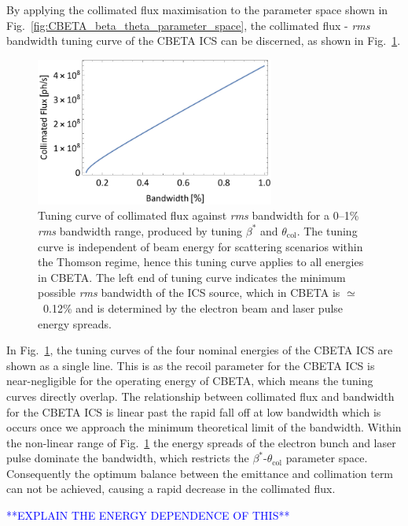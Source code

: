 \documentclass[../main.tex]{subfiles}
\begin{document}
By applying the collimated flux maximisation to the parameter space shown in Fig.~\ref{fig:CBETA_beta_theta_parameter_space}, the collimated flux - \textit{rms} bandwidth tuning curve of the CBETA ICS can be discerned, as shown in Fig.~\ref{fig:CBETA_Tuning_Curve}. 
\begin{figure}[!h]
\centering
\includegraphics[width=0.7\textwidth]{Figures/CBETA_Inverse_Compton_Source_Design/CBETATuningCurve.pdf}
\caption{Tuning curve of collimated flux against \textit{rms} bandwidth for a 0--1\% \textit{rms} bandwidth range, produced by tuning $\beta^{*}$ and $\theta_{\mathrm{col}}$. The tuning curve is independent of beam energy for scattering scenarios within the Thomson regime, hence this tuning curve applies to all energies in CBETA. The left end of tuning curve indicates the minimum possible \textit{rms} bandwidth of the ICS source, which in CBETA is $\simeq$~0.12\% and is determined by the electron beam and laser pulse energy spreads.}
\label{fig:CBETA_Tuning_Curve}
\end{figure}

In Fig.~\ref{fig:CBETA_Tuning_Curve}, the tuning curves of the four nominal energies of the CBETA ICS are shown as a single line. This is as the recoil parameter for the CBETA ICS is near-negligible for the operating energy of CBETA, which means the tuning curves directly overlap. The relationship between collimated flux and bandwidth for the CBETA ICS is linear past the rapid fall off at low bandwidth which is occurs once we approach the minimum theoretical limit of the bandwidth. Within the non-linear range of Fig.~\ref{fig:CBETA_Tuning_Curve} the energy spreads of the electron bunch and laser pulse dominate the bandwidth, which restricts the $\beta^{*}$-$\theta_{\mathrm{col}}$ parameter space. Consequently the optimum balance between the emittance and collimation term can not be achieved, causing a rapid decrease in the collimated flux.  

\textcolor{blue}{**EXPLAIN THE ENERGY DEPENDENCE OF THIS**}
\end{document}

